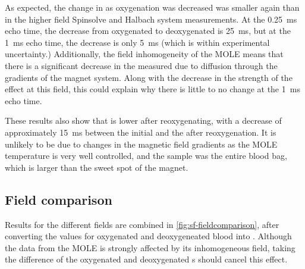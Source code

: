 As expected, the change in \Ttwo as oxygenation was decreased was smaller again than in the higher field Spinsolve and Halbach system measurements.
At the \SI{0.25}{ms} echo time, the decrease from oxygenated to deoxygenated is \SI{25}{ms}, but at the \SI{1}{ms} echo time, the decrease is only \SI{5}{ms} (which is within experimental uncertainty.)
Additionally, the field inhomogeneity of the MOLE means that there is a significant decrease in the measured \Ttwo due to diffusion through the gradients of the magnet system.
Along with the decrease in the strength of the effect at this field, this could explain why there is little to no change at the \SI{1}{ms} echo time.

These results also show that \Ttwo is lower after reoxygenating, with a decrease of approximately \SI{15}{ms} between the initial \Ttwo and the \Ttwo after reoxygenation.
It is unlikely to be due to changes in the magnetic field gradients as the MOLE temperature is very well controlled, and the sample was the entire blood bag, which is larger than the sweet spot of the magnet.

\subsection{Field comparison}
Results for the different fields are combined in \autoref{fig:sf-fieldcomparison}, after converting the \Ttwo values for oxygenated and deoxygeneated blood into \Rtwo.
Although the data from the MOLE is strongly affected by its inhomogeneous field, taking the difference of the oxygenated and deoxygenated \Rtwo{}s should cancel this effect.

